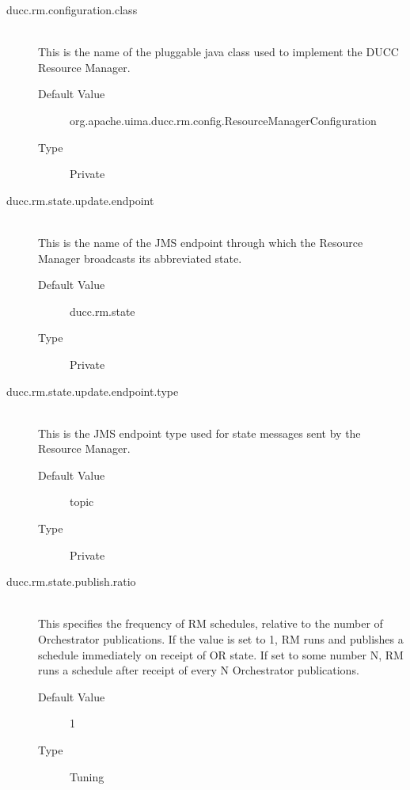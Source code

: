     \begin{description}
        \item[ducc.rm.configuration.class] \hfill \\
          This is the name of the pluggable java class used to implement the DUCC Resource 
          Manager. 
          \begin{description}
            \item[Default Value] org.apache.uima.ducc.rm.config.ResourceManagerConfiguration 
            \item[Type] Private 
          \end{description}
          
        \item[ducc.rm.state.update.endpoint] \hfill \\
          This is the name of the JMS endpoint through which the Resource Manager broadcasts its 
          abbreviated state. 
          \begin{description}
            \item[Default Value] ducc.rm.state              
            \item[Type] Private
          \end{description} 

        \item[ducc.rm.state.update.endpoint.type] \hfill \\
          This is the JMS endpoint type used for state messages sent by the Resource Manager.
          \begin{description}            
            \item[Default Value] topic 
            \item[Type] Private 
          \end{description}
          
        \item[ducc.rm.state.publish.ratio] \hfill \\
          This specifies the frequency of RM schedules, relative to the number of Orchestrator publications.  If
          the value is set to 1, RM runs and publishes a schedule immediately on receipt of OR state.  If set to
          some number N, RM runs a schedule after receipt of every N Orchestrator publications.
          \begin{description}
            \item[Default Value] 1
            \item[Type] Tuning
          \end{description} 
                    

\end{description}
